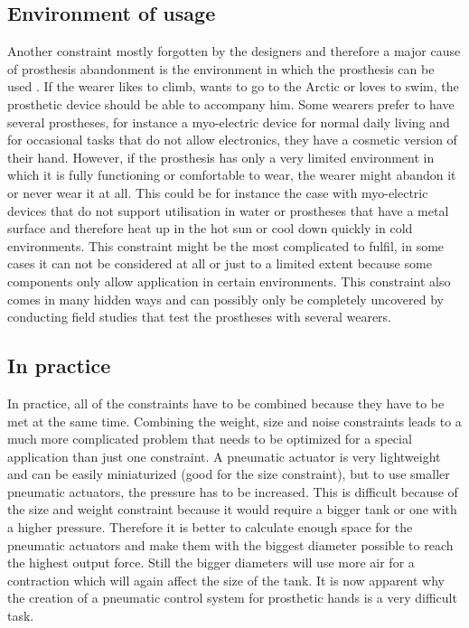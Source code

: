 \documentclass[main]{subfiles}
\begin{document}
\subsection{Environment of usage}

Another constraint mostly forgotten by the designers and therefore a major cause of prosthesis abandonment is the environment in which the prosthesis can be used \cite{abandonment1,abandonment2}. If the wearer likes to climb, wants to go to the Arctic or loves to swim, the prosthetic device should be able to accompany him. Some wearers prefer to have several prostheses, for instance a myo-electric device for normal daily living and for occasional tasks that do not allow electronics, they have a cosmetic version of their hand. However, if the prosthesis has only a very limited environment in which it is fully functioning or comfortable to wear, the wearer might abandon it or never wear it at all. This could be for instance the case with myo-electric devices that do not support utilisation in water or prostheses that have a metal surface and therefore heat up in the hot sun or cool down quickly in cold environments. This constraint might be the most complicated to fulfil, in some cases it can not be considered at all or just to a limited extent because some components only allow application in certain environments. This constraint also comes in many hidden ways and can possibly only be completely uncovered by conducting field studies that test the prostheses with several wearers.

\subsection{In practice}
In practice, all of the constraints have to be combined because they have to be met at the same time. Combining the weight, size and noise constraints leads to a much more complicated problem that needs to be optimized for a special application than just one constraint. A pneumatic actuator is very lightweight and can be easily miniaturized (good for the size constraint), but to use smaller pneumatic actuators, the pressure has to be increased. This is difficult because of the size and weight constraint because it would require a bigger tank or one with a higher pressure. Therefore it is better to calculate enough space for the pneumatic actuators and make them with the biggest diameter possible to reach the highest output force. Still the bigger diameters will use more air for a contraction which will again affect the size of the tank. It is now apparent why the creation of a pneumatic control system for prosthetic hands is a very difficult task.
\end{document}
